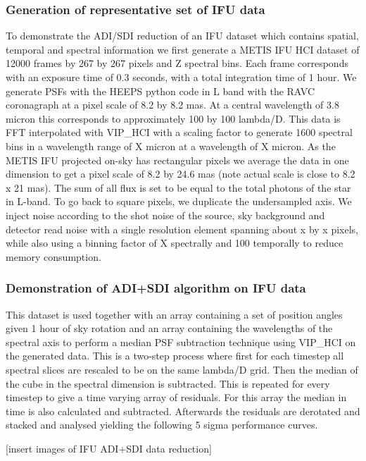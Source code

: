 \subsubsection{Generation of representative set of IFU data}

To demonstrate the ADI/SDI reduction of an IFU dataset which contains spatial, temporal and spectral information we first generate a METIS IFU HCI dataset of 12000 frames by 267 by 267 pixels and Z spectral bins. Each frame corresponds with an exposure time of 0.3 seconds, with a total integration time of 1 hour.  
We generate PSFs with the HEEPS python code in L band with the RAVC coronagraph at a pixel scale of 8.2 by 8.2 mas. At a central wavelength of 3.8 micron this corresponds to approximately 100 by 100 lambda/D. This data is FFT interpolated with VIP\_HCI with a scaling factor to generate 1600 spectral bins in a wavelength range of X micron at a wavelength of X micron. 
As the METIS IFU projected on-sky has rectangular pixels we average the data in one dimension to get a pixel scale of 8.2 by 24.6 mas (note actual scale is close to 8.2 x 21 mas). The sum of all flux is set to be equal to the total photons of the star in L-band.
To go back to square pixels, we duplicate the undersampled axis. We inject noise according to the shot noise of the source, sky background and detector read noise with a single resolution element spanning about x by x pixels, while also using a binning factor of X spectrally and 100 temporally to reduce memory consumption.



 


\subsubsection{Demonstration of ADI+SDI algorithm on IFU data}


This dataset is used together with an array containing a set of position angles given 1 hour of sky rotation and an array containing the wavelengths of the spectral axis to perform a median PSF subtraction technique using VIP\_HCI on the generated data. This is a two-step process where first for each timestep all spectral slices are rescaled to be on the same lambda/D grid. Then the median of the cube in the spectral dimension is subtracted. This is repeated for every timestep to give a time varying array of residuals. For this array the median in time is also calculated and subtracted. Afterwards the residuals are derotated and stacked and analysed yielding the following 5 sigma performance curves. 

[insert images of IFU ADI+SDI data reduction]